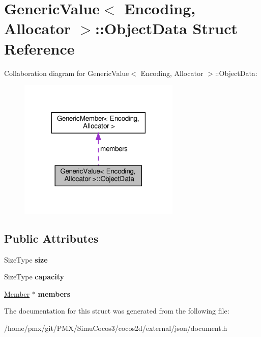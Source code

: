 \hypertarget{structGenericValue_1_1ObjectData}{}\section{Generic\+Value$<$ Encoding, Allocator $>$\+:\+:Object\+Data Struct Reference}
\label{structGenericValue_1_1ObjectData}


Collaboration diagram for Generic\+Value$<$ Encoding, Allocator $>$\+:\+:Object\+Data\+:
\nopagebreak
\begin{figure}[H]
\begin{center}
\leavevmode
\includegraphics[width=218pt]{structGenericValue_1_1ObjectData__coll__graph}
\end{center}
\end{figure}
\subsection*{Public Attributes}
\begin{DoxyCompactItemize}
\item 
\mbox{\label{structGenericValue_1_1ObjectData_a8aa09c430b245b9bb0745a1ab38201d5}} 
Size\+Type {\bfseries size}
\item 
\mbox{\label{structGenericValue_1_1ObjectData_a22b8d8b01d52db71471f0d4c990cb93b}} 
Size\+Type {\bfseries capacity}
\item 
\mbox{\label{structGenericValue_1_1ObjectData_a108be865f16e4c028f2354b1474a1ec8}} 
\hyperlink{classGenericValue_a7ccf27c44058b4c11c3efc6473afb886}{Member} $\ast$ {\bfseries members}
\end{DoxyCompactItemize}


The documentation for this struct was generated from the following file\+:\begin{DoxyCompactItemize}
\item 
/home/pmx/git/\+P\+M\+X/\+Simu\+Cocos3/cocos2d/external/json/document.\+h\end{DoxyCompactItemize}
